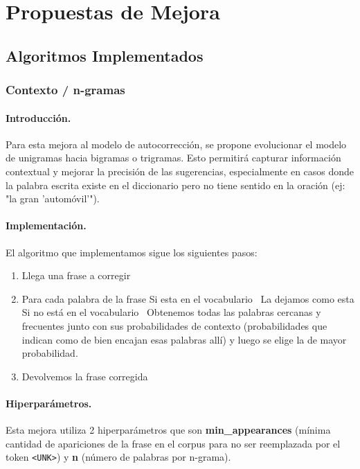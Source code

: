 \documentclass[12pt,a4paper]{article}
\begin{document}
\section{Propuestas de Mejora}
\subsection{Algoritmos Implementados}
\subsubsection{Contexto / n-gramas}

\paragraph{Introducción.}
Para esta mejora al modelo de autocorrección, se propone evolucionar el modelo de unigramas hacia bigramas o trigramas. Esto permitirá capturar información contextual y mejorar la precisión de las sugerencias, especialmente en casos donde la palabra escrita existe en el diccionario pero no tiene sentido en la oración (ej: "la gran 'automóvil'").

\paragraph{Implementación.}
El algoritmo que implementamos sigue los siguientes pasos:

\begin{enumerate}
    \item Llega una frase a corregir
    \item Para cada palabra de la frase
        \subitem Si esta en el vocabulario \rightarrow \ La dejamos como esta
        \subitem Si no está en el vocabulario \rightarrow \ Obtenemos todas las palabras cercanas y frecuentes junto con sus probabilidades de contexto (probabilidades que indican como de bien encajan esas palabras allí) y luego se elige la de mayor probabilidad.
    \item Devolvemos la frase corregida
\end{enumerate}

\paragraph{Hiperparámetros.}
Esta mejora utiliza 2 hiperparámetros que son \textbf{min\_appearances} (mínima cantidad de apariciones de la frase en el corpus para no ser reemplazada por el token \texttt{<UNK>}) y \textbf{n} (número de palabras por n-grama).
\end{document}

